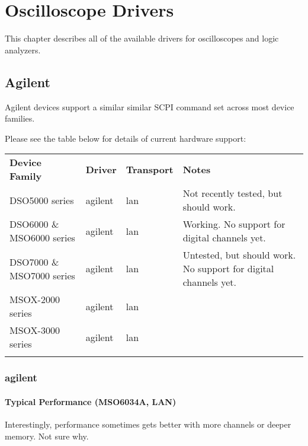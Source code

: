 \chapter{Oscilloscope Drivers}
\label{sec:scope-drivers}

This chapter describes all of the available drivers for oscilloscopes and logic analyzers.

\section{Agilent}

Agilent devices support a similar similar SCPI command set across most device families.

Please see the table below for details of current hardware support:

\begin{tabularx}{16cm}{lllX}
\thickhline
\textbf{Device Family} & \textbf{Driver} & \textbf{Transport} & \textbf{Notes} \\
\thickhline
DSO5000 series & agilent & lan & Not recently tested, but should work.\\
\thinhline
DSO6000 \& MSO6000 series & agilent & lan &  Working. No support for digital channels yet.\\
\thinhline
DSO7000 \& MSO7000 series & agilent & lan & Untested, but should work. No support for digital channels yet.\\
\thinhline
MSOX-2000 series & agilent & lan \\
\thinhline
MSOX-3000 series & agilent & lan \\
\thickhline
\end{tabularx}

\subsection{agilent}

\subsubsection{Typical Performance (MSO6034A, LAN)}

Interestingly, performance sometimes gets better with more channels or deeper memory. Not sure why.

